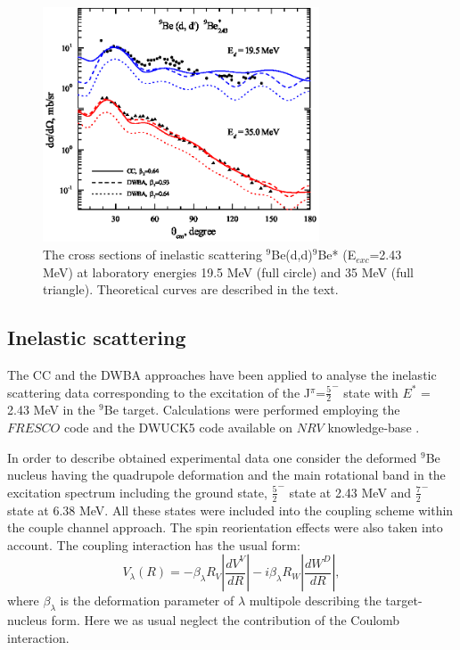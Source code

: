 \documentclass[10pt]{iopart}
\begin{document}
\begin{figure}[tp]
\centering
\includegraphics[width=8.2cm]{2H9BE2430MEV.eps}

\caption{\label{2H9BE2430MEV}The cross sections of inelastic scattering $^9$Be(d,d)$^9$Be* (E$_{exc}$=2.43 MeV) at laboratory energies 19.5 MeV (full circle) and 35 MeV (full triangle). Theoretical curves are described in the text.}
\end{figure}

\subsection{Inelastic scattering}
The CC and the DWBA approaches have been applied to analyse the inelastic scattering data corresponding to the excitation of the J$^{\pi}$=$\frac{5}{2}^-$ state with $E^*$ = 2.43 MeV in the ${}^9$Be target. Calculations were performed employing the $FRESCO$ code \cite{fresco} and the DWUCK5 code available on $NRV$ knowledge-base \cite{nrv}.

In order to describe obtained experimental data one consider the deformed ${}^9$Be nucleus having the quadrupole deformation and the main rotational band in the excitation spectrum including the ground state, $\frac{5}{2}^-$ state at 2.43 MeV and $\frac{7}{2}^-$ state at 6.38 MeV. All these states were included into the coupling scheme within the couple channel approach. The spin reorientation effects were also taken into account. The coupling interaction has the usual form:
\begin{equation}
V_\lambda(R)=-\beta_\lambda R_V \left|\frac{d V^V}{dR}\right| - i \beta_\lambda R_W \left|\frac{d W^D}{dR}\right|,
\end{equation}
where $\beta_\lambda$ is the deformation parameter of $\lambda$ multipole describing the target-nucleus form. Here we as usual neglect the contribution of the Coulomb interaction.
\end{document}
